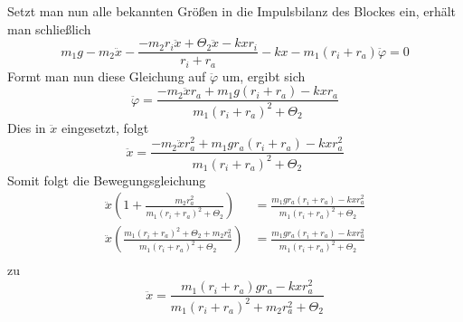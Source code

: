 Setzt man nun alle bekannten Größen in die Impulsbilanz des Blockes ein, erhält man schließlich
\[
	m_1g - m_2\ddot{x} - \frac{-m_2r_i\ddot{x} + \Theta_2\ddot{x} - kxr_i}{r_i + r_a} - kx - m_1(r_i + r_a)\ddot{\varphi} = 0
\]
Formt man nun diese Gleichung auf $\ddot{\varphi}$ um, ergibt sich
\[
	\ddot{\varphi} = \frac{- m_2\ddot{x}r_a + m_1g(r_i + r_a) - kxr_a}{m_1(r_i + r_a)^2 + \Theta_2}
\]
Dies in $\ddot{x}$ eingesetzt, folgt
\[
	\ddot{x} = \frac{-m_2\ddot{x}r_a^2 + m_1gr_a(r_i + r_a) - kxr_a^2}{m_1(r_i + r_a)^2 + \Theta_2}
\]
Somit folgt die Bewegungsgleichung
\begin{align*}
\ddot{x}\left( 1 + \frac{m_2r_a^2}{m_1(r_i + r_a)^2 + \Theta_2}\right) &= \frac{m_1gr_a(r_i + r_a) - kxr_a^2}{m_1(r_i + r_a)^2 + \Theta_2} \\
\ddot{x}\left(\frac{m_1(r_i + r_a)^2 + \Theta_2 + m_2r_a^2}{m_1(r_i + r_a)^2 + \Theta_2}\right)  &= \frac{m_1gr_a(r_i + r_a) - kxr_a^2}{m_1(r_i + r_a)^2 + \Theta_2} \\
\end{align*}
zu
\[
\ddot{x} = \frac{m_1(r_i + r_a)gr_a - kxr_a^2}{m_1(r_i + r_a)^2 + m_2r_a^2 + \Theta_2}
\]
